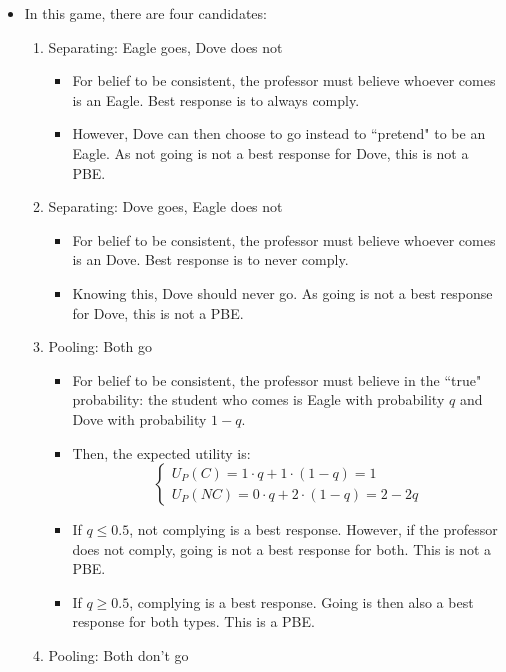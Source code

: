 \documentclass[notitlepage]{article}
\begin{document}
\begin{itemize}
    \item In this game, there are four candidates:
    \begin{enumerate}
        \item Separating: Eagle goes, Dove does not
        \begin{itemize}
            \item For belief to be consistent, the professor must believe whoever comes is an Eagle. Best response is to always comply.
            \item However, Dove can then choose to go instead to ``pretend" to be an Eagle. As not going is not a best response for Dove, this is not a PBE.
        \end{itemize}
        \item Separating: Dove goes, Eagle does not
        \begin{itemize}
            \item For belief to be consistent, the professor must believe whoever comes is an Dove. Best response is to never comply.
            \item Knowing this, Dove should never go. As going is not a best response for Dove, this is not a PBE.
        \end{itemize}
        \item Pooling: Both go
        \begin{itemize}
            \item For belief to be consistent, the professor must believe in the ``true" probability: the student who comes is Eagle with probability \(q\) and Dove with probability \(1-q\).
            \item Then, the expected utility is:
            \[
            \begin{cases}
                U_P(C) = 1 \cdot q + 1 \cdot (1-q) = 1  \\
                U_P(NC) = 0 \cdot q + 2 \cdot (1-q) = 2-2q
            \end{cases}
            \]
            \item If \(q \le 0.5\), not complying is a best response. However, if the professor does not comply, going is not a best response for both. This is not a PBE.
            \item If \(q \ge 0.5\), complying is a best response. Going is then also a best response for both types. This is a PBE.
        \end{itemize}
        \item Pooling: Both don't go
        \begin{itemize}

\end{itemize}
\end{enumerate}
\end{itemize}
\end{document}
